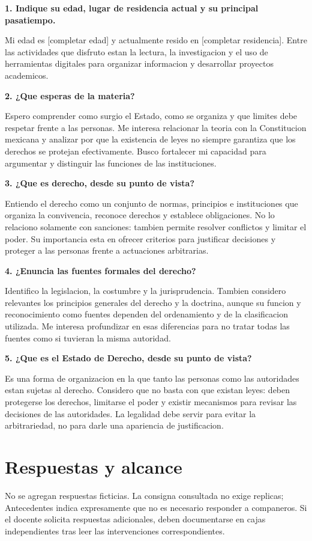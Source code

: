 \documentclass[spanish,letterpaper,oneside]{article}
\begin{document}
\begin{forobox}[title={Participacion principal -- propuesta no publicada}]

\textbf{1. Indique su edad, lugar de residencia actual y su principal
pasatiempo.}

Mi edad es {[}completar edad{]} y actualmente resido en {[}completar
residencia{]}. Entre las actividades que disfruto estan la lectura, la
investigacion y el uso de herramientas digitales para organizar
informacion y desarrollar proyectos academicos.

\textbf{2. ¿Que esperas de la materia?}

Espero comprender como surgio el Estado, como se organiza y que limites
debe respetar frente a las personas. Me interesa relacionar la teoria
con la Constitucion mexicana y analizar por que la existencia de leyes
no siempre garantiza que los derechos se protejan efectivamente. Busco
fortalecer mi capacidad para argumentar y distinguir las funciones de
las instituciones.

\textbf{3. ¿Que es derecho, desde su punto de vista?}

Entiendo el derecho como un conjunto de normas, principios e
instituciones que organiza la convivencia, reconoce derechos y establece
obligaciones. No lo relaciono solamente con sanciones: tambien permite
resolver conflictos y limitar el poder. Su importancia esta en ofrecer
criterios para justificar decisiones y proteger a las personas frente a
actuaciones arbitrarias.

\textbf{4. ¿Enuncia las fuentes formales del derecho?}

Identifico la legislacion, la costumbre y la jurisprudencia. Tambien
considero relevantes los principios generales del derecho y la doctrina,
aunque su funcion y reconocimiento como fuentes dependen del
ordenamiento y de la clasificacion utilizada. Me interesa profundizar en
esas diferencias para no tratar todas las fuentes como si tuvieran la
misma autoridad.

\textbf{5. ¿Que es el Estado de Derecho, desde su punto de vista?}

Es una forma de organizacion en la que tanto las personas como las
autoridades estan sujetas al derecho. Considero que no basta con que
existan leyes: deben protegerse los derechos, limitarse el poder y
existir mecanismos para revisar las decisiones de las autoridades. La
legalidad debe servir para evitar la arbitrariedad, no para darle una
apariencia de justificacion.

\end{forobox}

\section{Respuestas y alcance}

No se agregan respuestas ficticias. La consigna consultada no exige replicas; Antecedentes indica expresamente que no es necesario responder a companeros. Si el docente solicita respuestas adicionales, deben documentarse en cajas independientes tras leer las intervenciones correspondientes.
\end{document}

